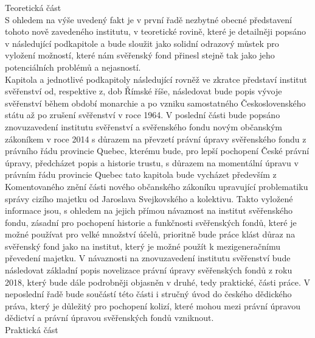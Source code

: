 \documentclass{article}
\begin{document}
\newpage

{\Large Teoretická část}\\

S ohledem na výše uvedený fakt je v první řadě nezbytné obecné představení tohoto nově zavedeného institutu, v teoretické rovině, které je detailněji popsáno v následující podkapitole a bude sloužit jako solidní odrazový můstek pro vyložení možností, které nám svěřenský fond přinesl stejně tak jako jeho potenciálních problémů a nejasností. \\

Kapitola a jednotlivé podkapitoly následující rovněž ve zkratce představí institut svěřenství od, respektive z, dob Římské říše, následovat bude popis vývoje svěřenství během období monarchie a po vzniku samostatného Československého státu až po zrušení svěřenství v roce 1964. V poslední části bude popsáno znovuzavedení institutu svěřenství a svěřenského fondu novým občanským zákoníkem v roce 2014 s důrazem na převzetí právní úpravy svěřenského fondu z právního řádu provincie Quebec, kterému bude, pro lepší pochopení České právní úpravy, předcházet popis a historie trustu, s důrazem na momentální úpravu v právním řádu provincie Quebec tato kapitola bude vycházet především z Komentovaného znění části nového občanského zákoníku upravující problematiku správy cizího majetku od Jaroslava Svejkovského a kolektivu. Takto vyložené informace jsou, s ohledem na jejich přímou návaznost na institut svěřenského fondu, zásadní pro pochopení historie a funkčnosti svěřenských fondů, které je možné používat pro velké množství účelů, prioritně bude práce klást důraz na svěřenský fond jako na institut, který je možné použít k mezigeneračnímu převedení majetku. V návaznosti na znovuzavedení institutu svěřenství bude následovat základní popis novelizace právní úpravy svěřenských fondů z roku 2018, který bude dále podrobněji objasněn v druhé, tedy praktické, části práce. V neposlední řadě bude součástí této části i stručný úvod do českého dědického práva, který je důležitý pro pochopení kolizí, které mohou mezi právní úpravou dědictví a právní úpravou svěřenských fondů vzniknout.\\

{\Large Praktická část}\\
\end{document}

